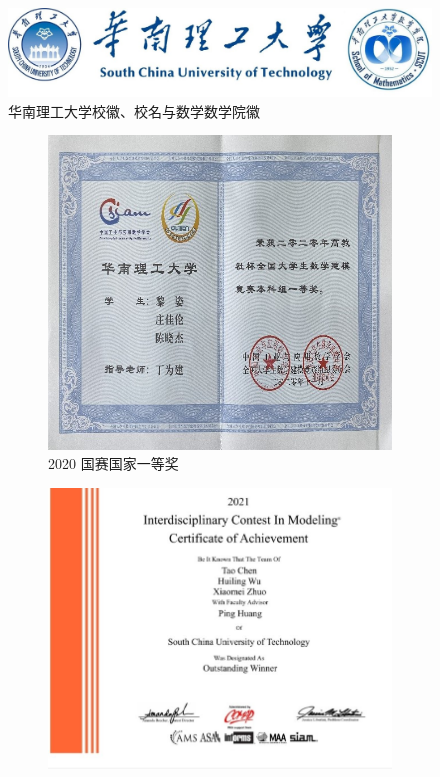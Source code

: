 \documentclass[12pt,utf8]{article}
\begin{document}
\begin{figure}[htb]
\centering
\includegraphics[width=1\linewidth]{./figures/logo}
\caption{华南理工大学校徽、校名与数学数学院徽}
\label{fig:logo}
\end{figure}

\begin{figure}[H]
\centering
\begin{subfigure}{0.4\textwidth}
    \includegraphics[width=\textwidth,angle=90]{./figures/CUMCM2020}
    \caption{2020 国赛国家一等奖}
    \label{fig:first}
\end{subfigure}
\hfill
\begin{subfigure}{0.4\textwidth}
    \includegraphics[width=1.2\textwidth]{./figures/MCM2021}

\end{subfigure}
\end{figure}
\end{document}
